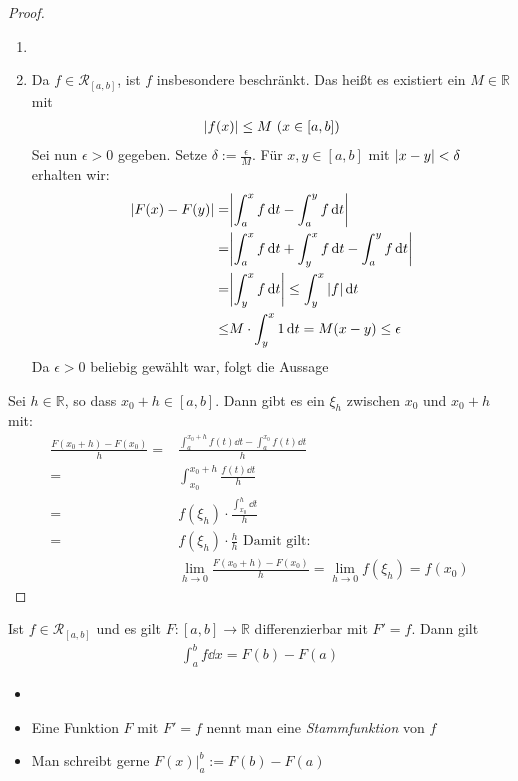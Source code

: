 \begin{proof}
	\begin{enumerate}
		\item[ ]
		\item Da $f \in \mathcal{R}_{[a,b]}$, ist $f$ insbesondere beschränkt.
		Das heißt es existiert ein $M \in \mathbb{R}$ mit 
		\begin{align*}
			\abs{f(x)} \leq M \text{ } (x \in [a,b])
		\end{align*}
		Sei nun $\epsilon > 0$ gegeben. Setze $\delta := \frac{\epsilon}{M}$. 
		Für $x, y \in [a,b]$ mit $\abs{x-y} < \delta$ erhalten wir:
		\begin{align*}
			\abs{F(x) - F(y)} = & \abs{\int_a^x f \dd{t} - \int_a^y f \dd{t} }\\
			= &  \abs{\int_a^x f\dd{t} + \int_y^x f\dd{t} - \int_a^yf\dd{t}}\\
			= & \abs{\int_y^x f\dd{t}} \leq \int_y^x \abs{f} \dd{t}\\
			\leq & M \cdot \int_y^x 1 \dd{t} = M (x-y) \leq \epsilon
		\end{align*}
		Da $\epsilon > 0$ beliebig gewählt war, folgt die Aussage
	\end{enumerate}
	\item Sei $h \in \mathbb{R}$, so dass $x_0 +h \in [a,b]$.
	Dann gibt es ein $\xi_h$ zwischen $x_0$ und $x_0+h$ mit:
	\begin{align*}
		\frac{F(x_0 + h) - F(x_0)}{h} = & \frac{\int_a^{x_0+h}f(t)\dd{t}-
		\int_a^{x_0}f(t)\dd{t}}{	h} \\
		= & \int_{x_0}^{x_0+h}\frac{f(t)\dd{t}}{h} \\
		= & f(\xi_h) \cdot \frac{\int_{x_0}^h \dd{t}}{h} \\
		= & f(\xi_h) \cdot \frac{h}{h} \text{ Damit gilt:} \\
		&\lim\limits_{h \rightarrow 0}{\frac{F(x_0+h)-F(x_0)}{h}} 
		= \lim\limits_{h \rightarrow 0} f(\xi_h) = f(x_0)
	\end{align*}
\end{proof}


\begin{Satz}{\label{vl_12_satz_02}
	Ist $f \in \mathcal{R}_{[a,b]}$ und es gilt $F: [a,b] \rightarrow \mathbb{R}$
	differenzierbar mit $F' = f$. Dann gilt
	\begin{align*}
		\int_a^b f\dd{x} = F(b) - F(a) 
	\end{align*}
}\end{Satz}

\begin{Bemerkung}{
	\begin{itemize}
		\item[ ]
		\item Eine Funktion $F$ mit $F'=f$ nennt man eine \emph{Stammfunktion} 
		von $f$
		\item Man schreibt gerne $F(x) \vert_a^b := F(b) -F(a)$
	\end{itemize}
}\end{Bemerkung}

